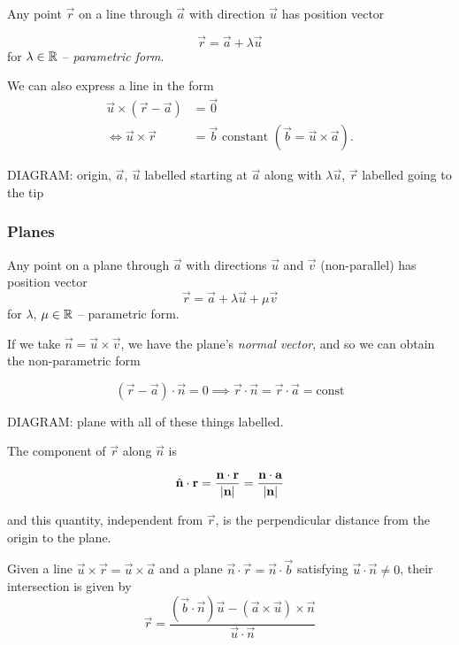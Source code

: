 \documentclass{../../template/note}
\begin{document}
    Any point \(\vec r\) on a line through \(\vec a\) with direction \(\vec u\) has position vector

    \[  
        \vec r = \vec a + \lambda \vec u 
    \]
    for \(\lambda \in \mathbb R\) -- \emph{parametric form}.

    We can also express a line in the form
    \begin{align*}
        \vec u \times (\vec r - \vec a) &= \vec 0 \\
        \iff \vec u \times \vec r &= \vec b \text{ constant } (\vec b = \vec u \times \vec a).
    \end{align*}

    
    DIAGRAM: origin, \(\vec a\), \(\vec u\) labelled starting at \(\vec a\) along with \(\lambda \vec u\), \(\vec r\) labelled going to the tip

    \subsubsection{Planes}

    Any point on a plane through \(\vec a\) with directions \(\vec u\) and \(\vec v\) (non-parallel) has position vector
    \[
        \vec r = \vec a + \lambda \vec u + \mu \vec v
    \]
    for \(\lambda\), \(\mu \in \mathbb R\) -- parametric form.

    If we take \(\vec n = \vec u \times \vec v\), we have the plane's \emph{normal vector}, and so we can obtain the non-parametric form

    \[  
        (\vec r - \vec a) \cdot \vec n = 0 \implies \vec r \cdot \vec n = \vec r \cdot \vec a = \text{const}
    \]

    DIAGRAM: plane with all of these things labelled.

    The component of \(\vec r\) along \(\vec n\) is

    \[
        \hvec n \cdot \vec r = \frac{\vec n \cdot \vec r}{|\vec n|} = \frac{\vec n \cdot \vec a}{|\vec n|}
    \]

    and this quantity, independent from \(\vec r\), is the perpendicular distance from the origin to the plane.

    \begin{proposition}
        Given a line \(\vec u \times \vec r = \vec u \times \vec a\) and a plane \(\vec n \cdot \vec r = \vec n \cdot \vec b\) satisfying \(\vec u \cdot \vec n \neq 0\), their intersection is given by
        \[
            \vec r = \frac{(\vec b \cdot \vec n)\vec u - (\vec a \times \vec u) \times \vec n}{\vec u \cdot \vec n}
        \]
    \end{proposition}
    
\end{document}
